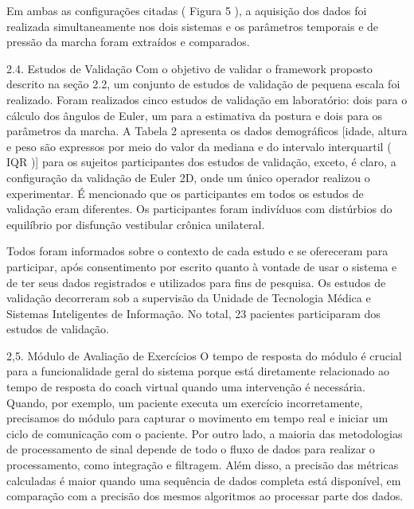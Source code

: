 \documentclass[10pt,a4paper,compsoc]{IEEEtran}
\begin{document}
Em ambas as configurações citadas ( Figura 5 ), a aquisição dos dados foi realizada simultaneamente nos dois sistemas e os parâmetros temporais e de pressão da marcha foram extraídos e comparados.

2.4. Estudos de Validação
Com o objetivo de validar o framework proposto descrito na seção 2.2, um conjunto de estudos de validação de pequena escala foi realizado. Foram realizados cinco estudos de validação em laboratório: dois para o cálculo dos ângulos de Euler, um para a estimativa da postura e dois para os parâmetros da marcha. A Tabela 2 apresenta os dados demográficos [idade, altura e peso são expressos por meio do valor da mediana e do intervalo interquartil ( IQR )] para os sujeitos participantes dos estudos de validação, exceto, é claro, a configuração da validação de Euler 2D, onde um único operador realizou o experimentar. É mencionado que os participantes em todos os estudos de validação eram diferentes. Os participantes foram indivíduos com distúrbios do equilíbrio por disfunção vestibular crônica unilateral.

Todos foram informados sobre o contexto de cada estudo e se ofereceram para participar, após consentimento por escrito quanto à vontade de usar o sistema e de ter seus dados registrados e utilizados para fins de pesquisa. Os estudos de validação decorreram sob a supervisão da Unidade de Tecnologia Médica e Sistemas Inteligentes de Informação. No total, 23 pacientes participaram dos estudos de validação.

2,5. Módulo de Avaliação de Exercícios
O tempo de resposta do módulo é crucial para a funcionalidade geral do sistema porque está diretamente relacionado ao tempo de resposta do coach virtual quando uma intervenção é necessária. Quando, por exemplo, um paciente executa um exercício incorretamente, precisamos do módulo para capturar o movimento em tempo real e iniciar um ciclo de comunicação com o paciente. Por outro lado, a maioria das metodologias de processamento de sinal depende de todo o fluxo de dados para realizar o processamento, como integração e filtragem. Além disso, a precisão das métricas calculadas é maior quando uma sequência de dados completa está disponível, em comparação com a precisão dos mesmos algoritmos ao processar parte dos dados.
\end{document}
